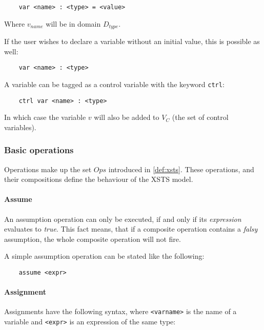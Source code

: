 \begin{Verbatim}
	var <name> : <type> = <value>
\end{Verbatim}

Where \(v_{name}\) will be in domain \(D_{type}\).

If the user wishes to declare a variable without an initial value, this is possible as well:

\begin{Verbatim}
	var <name> : <type>
\end{Verbatim}

A variable can be tagged as a control variable with the keyword \verb|ctrl|:

\begin{Verbatim}
	ctrl var <name> : <type>
\end{Verbatim}

In which case the variable \(v\) will also be added to \(V_C\) (the set of control variables).

\subsubsection{Basic operations}

Operations make up the set \(Ops\) introduced in \autoref{def:xsts}. These operations, and their compositions define the behaviour of the XSTS model.

\paragraph{Assume}

An assumption operation can only be executed, if and only if its \emph{expression} evaluates to \emph{true}. This fact means, that if a composite operation contains a \emph{falsy} assumption, the whole composite operation will not fire.

A simple assumption operation can be stated like the following:

\begin{Verbatim}
	assume <expr>
\end{Verbatim}

\paragraph{Assignment}

Assignments have the following syntax, where \verb|<varname>| is the name of a variable and
\verb|<expr>| is an expression of the same type:

